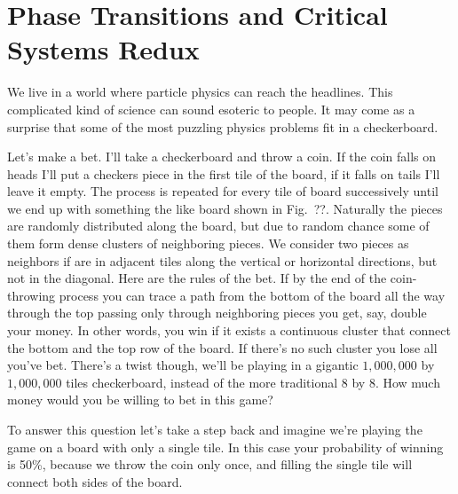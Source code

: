 \chapter{Phase Transitions and Critical Systems Redux}
\label{ch:criticality}


We live in a world where particle physics can reach the headlines. This
complicated kind of science can sound esoteric to people. It may come as a
surprise that some of the most puzzling physics problems fit in a checkerboard.

Let's make a bet. I'll take a checkerboard and throw a coin. If the coin falls
on heads I'll put a checkers piece in the first tile of the board, if it falls
on tails I'll leave it empty. The process is repeated for every tile of board
successively until we end up with something the like board shown in Fig.~??.
Naturally the pieces are randomly distributed along the board, but due to
random chance some of them form dense clusters of neighboring pieces. We
consider two pieces as neighbors if are in adjacent tiles along the vertical or
horizontal directions, but not in the diagonal. Here are the rules of the bet.
If by the end of the coin-throwing process you can trace a path from the bottom
of the board all the way through the top passing only through neighboring
pieces you get, say, double your money. In other words, you win if it exists a
continuous cluster that connect the bottom and the top row of the board. If
there's no such cluster you lose all you've bet. There's a twist though, we'll
be playing in a gigantic $1,000,000$ by $1,000,000$ tiles checkerboard, instead of
the more traditional 8 by 8. How much money would you be willing to bet in this
game?

To answer this question let's take a step back and imagine we're playing the
game on a board with only a single tile. In this case your probability of
winning is 50\%, because we throw the coin only once, and filling the single
tile will connect both sides of the board.

